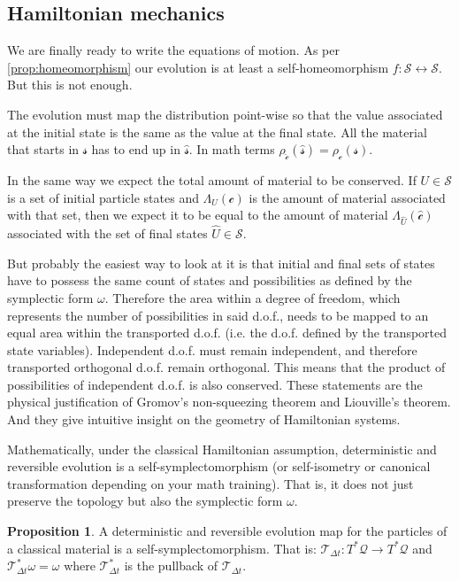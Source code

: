 \documentclass[smallextended]{svjour3}
\numberwithin{equation}{section}
\theoremstyle{definition}
\newtheorem{prop}[equation]{Proposition}
\begin{document}
\subsection{Hamiltonian mechanics}

We are finally ready to write the equations of motion. As per \ref{prop:homeomorphism} our evolution is at least a self-homeomorphism $f:\mathcal{S} \leftrightarrow \mathcal{S}$. But this is not enough.

The evolution must map the distribution point-wise so that the value associated at the initial state is the same as the value at the final state. All the material that starts in $\mathcal{s}$ has to end up in $\hat{\mathcal{s}}$. In math terms $\rho_{\hat{\mathcal{c}}} (\hat{\mathcal{s}}) = \rho_\mathcal{c}(\mathcal{s})$.

In the same way we expect the total amount of material to be conserved. If $U \in \mathcal{S}$ is a set of initial particle states and $\Lambda_U(\mathcal{c})$ is the amount of material associated with that set, then we expect it to be equal to the amount of material $\Lambda_{\hat{U}}(\hat{\mathcal{c}})$ associated with the set of final states $\hat{U} \in \mathcal{S}$.

But probably the easiest way to look at it is that initial and final sets of states have to possess the same count of states and possibilities as defined by the symplectic form $\omega$. Therefore the area within a degree of freedom, which represents the number of possibilities in said d.o.f., needs to be mapped to an equal area within the transported d.o.f. (i.e. the d.o.f. defined by the transported state variables). Independent d.o.f. must remain independent, and therefore transported orthogonal d.o.f. remain orthogonal. This means that the product of possibilities of independent d.o.f. is also conserved. These statements are the physical justification of Gromov's non-squeezing theorem \cite{Gromov,deGosson,Stewart} and Liouville's theorem. And they give intuitive insight on the geometry of Hamiltonian systems.

Mathematically, under the classical Hamiltonian assumption,  deterministic and reversible evolution is a self-symplectomorphism (or self-isometry or canonical transformation depending on your math training). That is, it does not just preserve the topology but also the symplectic form $\omega$.

\begin{prop}\label{prop:symplectomorphism}
	A deterministic and reversible evolution map for the particles of a classical material is a self-symplectomorphism. That is: $\mathcal{T}_{\Delta t}: T^*\mathcal{Q} \rightarrow T^*\mathcal{Q}$ and $\mathcal{T}_{\Delta t}^*\omega = \omega$ where $\mathcal{T}_{\Delta t}^*$ is the pullback of $\mathcal{T}_{\Delta t}$.
\end{prop}
\end{document}
